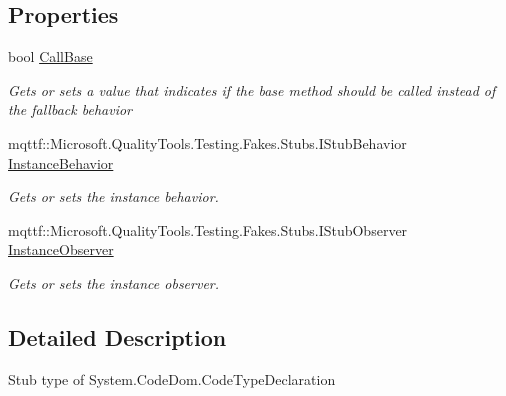 \subsection*{Properties}
\begin{DoxyCompactItemize}
\item 
bool \hyperlink{class_system_1_1_code_dom_1_1_fakes_1_1_stub_code_type_declaration_a83c8d6302fa0e49746095b31002cb4b1}{Call\-Base}
\begin{DoxyCompactList}\small\item\em Gets or sets a value that indicates if the base method should be called instead of the fallback behavior\end{DoxyCompactList}\item 
mqttf\-::\-Microsoft.\-Quality\-Tools.\-Testing.\-Fakes.\-Stubs.\-I\-Stub\-Behavior \hyperlink{class_system_1_1_code_dom_1_1_fakes_1_1_stub_code_type_declaration_ae5ab494efdee1402bb4268787abfd93c}{Instance\-Behavior}
\begin{DoxyCompactList}\small\item\em Gets or sets the instance behavior.\end{DoxyCompactList}\item 
mqttf\-::\-Microsoft.\-Quality\-Tools.\-Testing.\-Fakes.\-Stubs.\-I\-Stub\-Observer \hyperlink{class_system_1_1_code_dom_1_1_fakes_1_1_stub_code_type_declaration_a8a68c4b53e532274525d3a13b1d6da47}{Instance\-Observer}
\begin{DoxyCompactList}\small\item\em Gets or sets the instance observer.\end{DoxyCompactList}\end{DoxyCompactItemize}


\subsection{Detailed Description}
Stub type of System.\-Code\-Dom.\-Code\-Type\-Declaration



